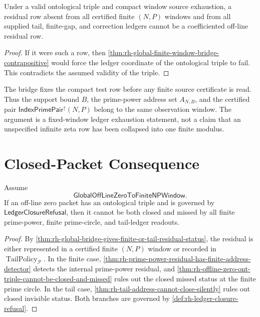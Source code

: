 \begin{corollary}
\label{cor:rh-no-finite-or-ledger-account-nullifies-residual-row}
Under a valid ontological triple and compact window source exhaustion,
a residual row absent from all certified finite $(N,P)$ windows and
from all supplied tail, finite-gap, and correction ledgers cannot be a
coefficiented off-line residual row.
\end{corollary}

\begin{proof}
If it were such a row, then
\autoref{thm:rh-global-finite-window-bridge-contrapositive} would force
the ledger coordinate of the ontological triple to fail.  This
contradicts the assumed validity of the triple.
\end{proof}

\begin{principle}
\label{prin:rh-fixed-window-discipline-global-bridge}
The bridge fixes the compact test row before any finite source
certificate is read.  Thus the support bound $B$, the prime-power
address set $A_{N,B}$, and the certified pair
$\mathsf{IndexPrimePair}^{\uparrow}(N,P)$ belong to the same
observation window.  The argument is a fixed-window ledger exhaustion
statement, not a claim that an unspecified infinite zeta row has been
collapsed into one finite modulus.
\end{principle}

\section{Closed-Packet Consequence}
\label{sec:rh-global-window-closed-packet-consequence}

\begin{theorem}
\label{thm:rh-global-bridge-feeds-finite-address-refusal}
Assume
$$
\mathsf{GlobalOffLineZeroToFiniteNPWindow}.
$$
If an off-line zero packet has an ontological triple and is governed by
$\mathsf{LedgerClosureRefusal}$, then it cannot be both closed and
missed by all finite prime-power, finite prime-circle, and tail-ledger
readouts.
\end{theorem}

\begin{proof}
By
\autoref{thm:rh-global-bridge-gives-finite-or-tail-residual-status}, the
residual is either represented in a certified finite $(N,P)$ window or
recorded in $\operatorname{TailPolicy}_{\mathcal P}$.  In the finite
case, \autoref{thm:rh-prime-power-residual-has-finite-address-detector}
detects the internal prime-power residual, and
\autoref{thm:rh-offline-zero-ont-triple-cannot-be-closed-and-missed}
rules out the closed missed status at the finite prime circle.  In the
tail case, \autoref{thm:rh-tail-address-cannot-close-silently} rules
out closed invisible status.  Both branches are governed by
\autoref{def:rh-ledger-closure-refusal}.
\end{proof}

